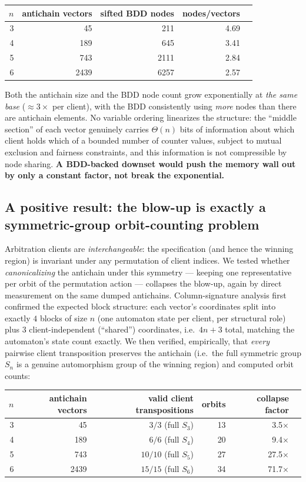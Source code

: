 \documentclass[11pt]{article}
\begin{document}
\begin{center}
\begin{tabular}{@{}rrrrr@{}}
\toprule
$n$ & antichain vectors & sifted BDD nodes & nodes/vectors\\
\midrule
3 & 45   & 211  & 4.69\\
4 & 189  & 645  & 3.41\\
5 & 743  & 2111 & 2.84\\
6 & 2439 & 6257 & 2.57\\
\bottomrule
\end{tabular}
\end{center}

Both the antichain size and the BDD node count grow exponentially at
\emph{the same base} ($\approx 3\times$ per client), with the BDD
consistently using \emph{more} nodes than there are antichain elements. No
variable ordering linearizes the structure: the ``middle section'' of each
vector genuinely carries $\Theta(n)$ bits of information about which client
holds which of a bounded number of counter values, subject to mutual
exclusion and fairness constraints, and this information is not compressible
by node sharing. \textbf{A BDD-backed downset would push the memory wall out
by only a constant factor, not break the exponential.}

\subsection{A positive result: the blow-up is exactly a symmetric-group orbit-counting problem}
\label{sec:orbit-positive}
Arbitration clients are \emph{interchangeable}: the specification (and
hence the winning region) is invariant under any permutation of client
indices. We tested whether \emph{canonicalizing} the antichain under this
symmetry --- keeping one representative per orbit of the permutation action
--- collapses the blow-up, again by direct measurement on the same dumped
antichains. Column-signature analysis first confirmed the expected block
structure: each vector's coordinates split into exactly $4$ blocks of size
$n$ (one automaton state per client, per structural role) plus $3$
client-independent (``shared'') coordinates, i.e.\ $4n+3$ total, matching
the automaton's state count exactly. We then verified, empirically, that
\emph{every} pairwise client transposition preserves the antichain (i.e.\
the full symmetric group $S_n$ is a genuine automorphism group of the
winning region) and computed orbit counts:

\begin{center}
\begin{tabular}{@{}rrrrrr@{}}
\toprule
$n$ & antichain vectors & valid client transpositions & orbits & collapse factor\\
\midrule
3 & 45   & $3/3$ (full $S_3$)  & 13 & 3.5$\times$\\
4 & 189  & $6/6$ (full $S_4$)  & 20 & 9.4$\times$\\
5 & 743  & $10/10$ (full $S_5$) & 27 & 27.5$\times$\\
6 & 2439 & $15/15$ (full $S_6$) & 34 & 71.7$\times$\\
\bottomrule
\end{tabular}
\end{center}
\end{document}
